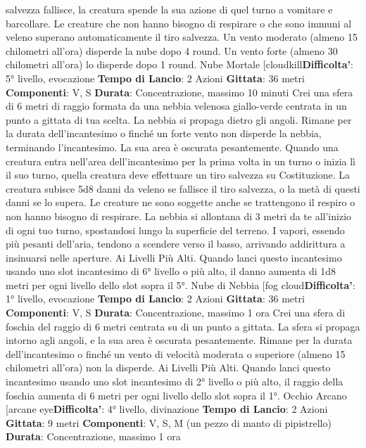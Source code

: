 \begin{multicols}{2}
salvezza fallisce, la creatura spende la sua azione di
quel turno a vomitare e barcollare. Le creature che non
hanno bisogno di respirare o che sono immuni al veleno
superano automaticamente il tiro salvezza.
Un vento moderato (almeno 15 chilometri all’ora)
disperde la nube dopo 4 round. Un vento forte (almeno
30 chilometri all’ora) lo disperde dopo 1 round.
Nube Mortale
[cloudkill\textbf{Difficolta'}:
5° livello, evocazione
\textbf{Tempo di Lancio}: 2 Azioni
\textbf{Gittata}: 36 metri
\textbf{Componenti}: V, S
\textbf{Durata}: Concentrazione, massimo 10 minuti
Crei una sfera di 6 metri di raggio formata da una
nebbia velenosa giallo-verde centrata in un punto a
gittata di tua scelta. La nebbia si propaga dietro gli
angoli. Rimane per la durata dell’incantesimo o finché
un forte vento non disperde la nebbia, terminando
l’incantesimo. La sua area è oscurata pesantemente.
Quando una creatura entra nell’area dell’incantesimo
per la prima volta in un turno o inizia lì il suo turno,
quella creatura deve effettuare un tiro salvezza su
Costituzione. La creatura subisce 5d8 danni da veleno
se fallisce il tiro salvezza, o la metà di questi danni se lo
supera. Le creature ne sono soggette anche se
trattengono il respiro o non hanno bisogno di respirare.
La nebbia si allontana di 3 metri da te all’inizio di ogni
tuo turno, spostandosi lungo la superficie del terreno. I
vapori, essendo più pesanti dell’aria, tendono a
scendere verso il basso, arrivando addirittura a
insinuarsi nelle aperture.
Ai Livelli Più Alti. Quando lanci questo incantesimo
usando uno slot incantesimo di 6° livello o più alto, il
danno aumenta di 1d8 metri per ogni livello dello slot
sopra il 5°.
Nube di Nebbia
[fog cloud\textbf{Difficolta'}:
1° livello, evocazione
\textbf{Tempo di Lancio}: 2 Azioni
\textbf{Gittata}: 36 metri
\textbf{Componenti}: V, S
\textbf{Durata}: Concentrazione, massimo 1 ora
Crei una sfera di foschia del raggio di 6 metri centrata
su di un punto a gittata. La sfera si propaga intorno agli
angoli, e la sua area è oscurata pesantemente. Rimane
per la durata dell’incantesimo o finché un vento di
velocità moderata o superiore (almeno 15 chilometri
all’ora) non la disperde.
Ai Livelli Più Alti. Quando lanci questo incantesimo
usando uno slot incantesimo di 2° livello o più alto, il
raggio della foschia aumenta di 6 metri per ogni livello
dello slot sopra il 1°.
Occhio Arcano
[arcane eye\textbf{Difficolta'}:
4° livello, divinazione
\textbf{Tempo di Lancio}: 2 Azioni
\textbf{Gittata}: 9 metri
\textbf{Componenti}: V, S, M (un pezzo di manto di pipistrello)
\textbf{Durata}: Concentrazione, massimo 1 ora

\end{multicols}
